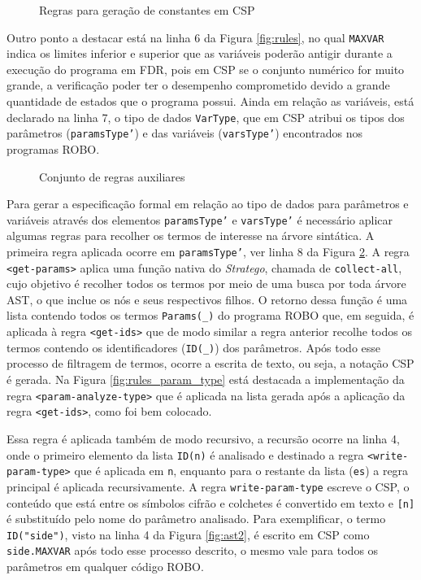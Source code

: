 \begin{figure}[h]
\centering
\caption{Regras para geração de constantes em CSP}

\label{fig:rules_constants}
\end{figure}

Outro ponto a destacar está na linha 6 da Figura \ref{fig:rules}, no qual \texttt{MAXVAR} indica os limites inferior e superior que as variáveis poderão antigir durante a execução do programa em FDR, pois em CSP se o conjunto numérico for muito grande, a verificação poder ter o desempenho comprometido devido a grande quantidade de estados que o programa possui. Ainda em relação as variáveis, está declarado na linha 7, o tipo de dados \texttt{VarType}, que em CSP atribui os tipos dos parâmetros (\texttt{paramsType'}) e das variáveis (\texttt{varsType'}) encontrados nos programas ROBO.

\begin{figure}[h]
\centering
\caption{Conjunto de regras auxiliares}

\label{fig:rules2}
\end{figure}

Para gerar a especificação formal em relação ao tipo de dados para parâmetros e variáveis através dos elementos \texttt{paramsType'} e \texttt{varsType'} é necessário aplicar algumas regras para recolher os termos de interesse na árvore sintática. A primeira regra aplicada ocorre em \texttt{paramsType'}, ver linha 8 da Figura \ref{fig:rules2}. A regra \texttt{<get-params>} aplica uma função nativa do \textit{Stratego}, chamada de \texttt{collect-all}, cujo objetivo é recolher todos os termos por meio de uma busca por toda árvore AST, o que inclue os nós e seus respectivos filhos. O retorno dessa função é uma lista contendo todos os termos \texttt{Params(\_)} do programa ROBO que, em seguida,  é aplicada à regra \texttt{<get-ids>} que de modo similar a regra anterior recolhe todos os termos contendo os identificadores (\texttt{ID(\_)}) dos parâmetros. Após todo esse processo de filtragem de termos, ocorre a escrita de texto, ou seja, a notação CSP é gerada. Na Figura \ref{fig:rules_param_type} está destacada a implementação da regra \texttt{<param-analyze-type>} que é aplicada na lista gerada após a aplicação da regra \texttt{<get-ids>}, como foi bem colocado.

Essa regra é aplicada também de modo recursivo, a recursão ocorre na linha 4, onde o primeiro elemento da lista \texttt{ID(n)} é analisado e destinado a regra \texttt{<write-param-type>} que é aplicada em \texttt{n}, enquanto para o restante da lista (\texttt{es}) a regra principal é aplicada recursivamente. A regra \texttt{write-param-type} escreve o CSP, o conteúdo que está entre os símbolos cifrão e colchetes é convertido em texto e \texttt{[n]} é substituído pelo nome do parâmetro analisado. Para exemplificar, o termo \texttt{ID("side")}, visto na linha 4 da Figura \ref{fig:ast2}, é escrito em CSP como \texttt{side.MAXVAR} após todo esse processo descrito, o mesmo vale para todos os parâmetros em qualquer código ROBO.

